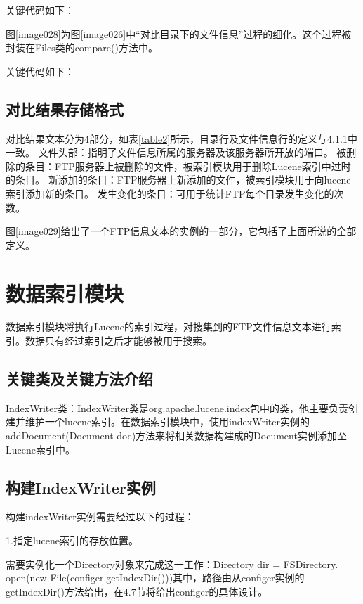关键代码如下：



图\ref{image028}为图\ref{image026}中“对比目录下的文件信息”过程的细化。这个过程被封装在Files类的compare()方法中。


关键代码如下：



\subsection{对比结果存储格式}
对比结果文本分为4部分，如表\ref{table2}所示，目录行及文件信息行的定义与4.1.1中一致。
文件头部：指明了文件信息所属的服务器及该服务器所开放的端口。
被删除的条目：FTP服务器上被删除的文件，被索引模块用于删除Lucene索引中过时的条目。
新添加的条目：FTP服务器上新添加的文件，被索引模块用于向lucene索引添加新的条目。
发生变化的条目：可用于统计FTP每个目录发生变化的次数。
\newpage
{}

图\ref{image029}给出了一个FTP信息文本的实例的一部分，它包括了上面所说的全部定义。


\section{数据索引模块}
数据索引模块将执行Lucene的索引过程，对搜集到的FTP文件信息文本进行索引。数据只有经过索引之后才能够被用于搜索。
\subsection{关键类及关键方法介绍}
IndexWriter类：IndexWriter类是org.apache.lucene.index包中的类，他主要负责创建并维护一个lucene索引。在数据索引模块中，使用indexWriter实例的\\add\-Docu\-ment\-(Document doc)方法来将相关数据构建成的Document实例添加至Lucene索引中。
\subsection{构建IndexWriter实例}
构建indexWriter实例需要经过以下的过程：

1.指定lucene索引的存放位置。

需要实例化一个Directory对象来完成这一工作：Directory dir = FSDirectory.\\open(new File(configer.getIndexDir()))其中，路径由从configer实例的getIndexDir()方法给出，在4.7节将给出configer的具体设计。

